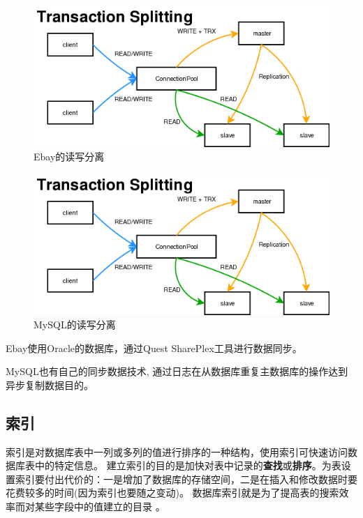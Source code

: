 \begin{figure}[ht]
	\begin{center}
		\includegraphics[keepaspectratio,width=0.5\paperwidth]{Pictures/Network/EbayRWSplitting.png}
	\caption{Ebay的读写分离}
	\label{fig:VirtualServer}
	\end{center}
\end{figure}

\begin{figure}[ht]
	\begin{center}
		\includegraphics[keepaspectratio,width=0.5\paperwidth]{Pictures/Network/MySQLSplitting.png}
	\caption{MySQL的读写分离}
	\label{fig:VirtualServer}
	\end{center}
\end{figure}


Ebay使用Oracle的数据库，通过Quest SharePlex工具进行数据同步。

MySQL也有自己的同步数据技术, 通过日志在从数据库重复主数据库的操作达到异步复制数据目的。



\subsection{索引}

索引是对数据库表中一列或多列的值进行排序的一种结构，使用索引可快速访问数据库表中的特定信息。
建立索引的目的是加快对表中记录的\textbf{查找}或\textbf{排序}。为表设置索引要付出代价的：一是增加了数据库的存储空间，二是在插入和修改数据时要花费较多的时间(因为索引也要随之变动)。
数据库索引就是为了提高表的搜索效率而对某些字段中的值建立的目录 。

